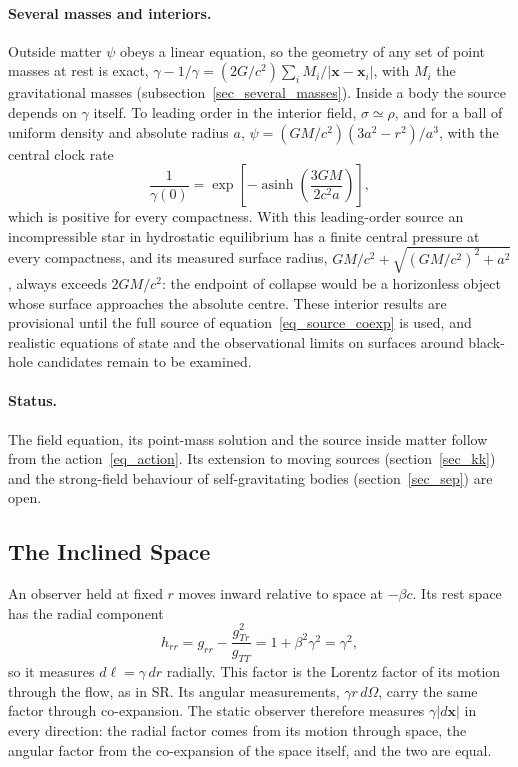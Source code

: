 \documentclass{iopjournal}
\begin{document}
\paragraph{Several masses and interiors.} Outside matter $\psi$ obeys a linear equation, so the geometry of any set of point masses at rest is exact, $\gamma-1/\gamma=(2G/c^2)\sum_iM_i/|\mathbf{x}-\mathbf{x}_i|$, with $M_i$ the gravitational masses (subsection~\ref{sec_several_masses}). Inside a body the source depends on $\gamma$ itself. To leading order in the interior field, $\sigma\simeq\rho$, and for a ball of uniform density and absolute radius $a$, $\psi=(GM/c^2)(3a^2-r^2)/a^3$, with the central clock rate
\begin{equation}\label{eq_ball_center}
    \frac{1}{\gamma(0)}=\exp\!\left[-\operatorname{asinh}\!\left(\frac{3GM}{2c^2a}\right)\right],
\end{equation}
which is positive for every compactness. With this leading-order source an incompressible star in hydrostatic equilibrium has a finite central pressure at every compactness, and its measured surface radius, $GM/c^2+\sqrt{(GM/c^2)^2+a^2}$, always exceeds $2GM/c^2$: the endpoint of collapse would be a horizonless object whose surface approaches the absolute centre. These interior results are provisional until the full source of equation~\eqref{eq_source_coexp} is used, and realistic equations of state and the observational limits on surfaces around black-hole candidates remain to be examined.

\paragraph{Status.} The field equation, its point-mass solution and the source inside matter follow from the action~\eqref{eq_action}. Its extension to moving sources (section~\ref{sec_kk}) and the strong-field behaviour of self-gravitating bodies (section~\ref{sec_sep}) are open.

\subsection{The Inclined Space}\label{sec_inclined_space}

An observer held at fixed $r$ moves inward relative to space at $-\beta c$. Its rest space has the radial component
\begin{equation}\label{eq_rest_space}
    h_{rr}=g_{rr}-\frac{g_{Tr}^2}{g_{TT}}=1+\beta^2\gamma^2=\gamma^2 ,
\end{equation}
so it measures $d\ell=\gamma\,dr$ radially. This factor is the Lorentz factor of its motion through the flow, as in SR. Its angular measurements, $\gamma r\,d\Omega$, carry the same factor through co-expansion. The static observer therefore measures $\gamma|d\mathbf{x}|$ in every direction: the radial factor comes from its motion through space, the angular factor from the co-expansion of the space itself, and the two are equal.
\end{document}
